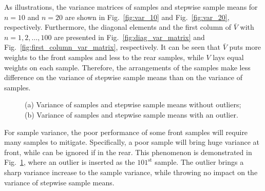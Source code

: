 \documentclass{article}
\begin{document}
As illustrations, the variance matrices of samples and stepwise sample means for $n=10$ and $n=20$ are shown in Fig.~\ref{fig:var_10} and Fig.~\ref{fig:var_20}, respectively. Furthermore, the diagonal elements and the first column of $\bar{V}$ with $n=1,2,\dots,100$ are presented in Fig.~\ref{fig:diag_var_matrix} and Fig.~\ref{fig:first_column_var_matrix}, respectively. It can be seen that $\bar{V}$ puts more weights to the front samples and less to the rear samples, while $V$ lays equal weights on each sample. Therefore, the arrangements of the samples make less difference on the variance of stepwise sample means than on the variance of samples. 

\begin{figure}[!h]
  \centering
  \caption{(a) Variance of samples and stepwise sample means without outliers; (b) Variance of samples and stepwise sample means with an outlier.}
  \label{fig:var_samples_vs_means}
\end{figure}

For sample variance, the poor performance of some front samples will require many samples to mitigate. Specifically, a poor sample will bring huge variance at front, while can be ignored if in the rear. This phenomenon is demonstrated in Fig.~\ref{fig:var_samples_vs_means}, where an outlier is inserted as the $101^{\text{st}}$ sample. The outlier brings a sharp variance increase to the sample variance, while throwing no impact on the variance of stepwise sample means.
\end{document}
